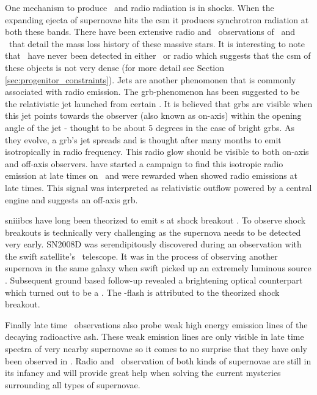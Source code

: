One mechanism to produce \xray\ and radio radiation is in shocks. When the expanding ejecta of supernovae hits the \gls{csm}   it produces synchrotron radiation at both these bands. There have been extensive radio and \xray\ observations of \sneii\ and \sneibc\ that detail the mass loss history of these massive stars. It is interesting to note that \sneia\ have never been detected in either \xray\ or radio which suggests that the \gls{csm} of these objects is not very dense (for more detail see Section \ref{sec:progenitor_constraints}). Jets are another phenomonen that is commonly associated with radio emission. The \gls{grb}-phenomenon has been suggested to be the relativistic jet launched from certain \snibc. It is believed that \glspl{grb} are visible when this jet points towards the observer (also known as on-axis) within the opening angle of the jet - thought to be about 5 degrees in the case of bright \glspl{grb}. As they evolve, a \gls{grb}'s jet spreads and is thought after many months to emit isotropically in radio frequency. This radio glow should be visible to both on-axis and off-axis observers. \cite{2006ApJ...638..930S} have started a campaign to find this isotropic radio emission at late times on \snibc\ and were rewarded when  showed radio emissions \citep{2010Natur.463..513S} at late times. This signal was interpreted as relativistic outflow powered by a central engine and suggests an off-axis \gls{grb}.

\glspl{sniiibc} have long been theorized to emit \xray s at shock breakout \citep{1978ApJ...223L.109K,1974ApJ...187..333C}. To observe shock breakouts is technically very challenging as the supernova needs to be detected very early. SN2008D was serendipitously discovered during an observation with the \gls{swift} satellite's \xray\ telescope. It was in the process of observing another supernova  in the same galaxy when \gls{swift} picked up an extremely luminous source \cite{2008Natur.453..469S}. Subsequent ground based follow-up revealed a brightening optical counterpart which turned out to be a \snibc. The \xray-flash is attributed to the theorized shock breakout.

Finally late time \xray\ observations also probe weak high energy emission lines of the decaying radioactive ash. These weak emission lines are only visible in late time spectra of very nearby supernovae so it comes to no surprise that they have only been observed in  \citep{1987Natur.330..230S, 1987Natur.330..230D}. Radio and \xray\ observation of both kinds of supernovae are still in its infancy and will provide great help when solving the current mysteries surrounding all types of supernovae.

